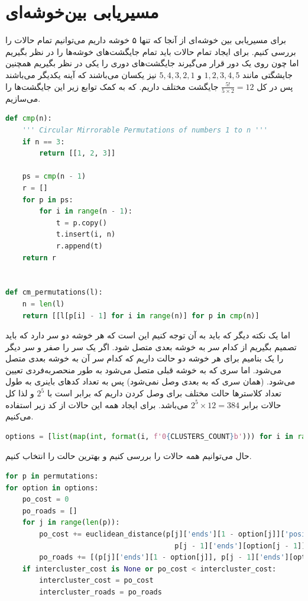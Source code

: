 \documentclass[a4paper, 12pt]{article}
\theoremstyle{definition}
\begin{document}
\section{مسیریابی بین‌خوشه‌ای}

برای مسیریابی بین خوشه‌ای از آنجا که تنها ۵ خوشه داریم می‌توانیم تمام حالات را بررسی کنیم. برای ایجاد تمام حالات باید تمام جایگشت‌های خوشه‌ها را در نظر بگیریم اما چون روی یک دور قرار می‌گیرند جایگشت‌های دوری را یکی در نظر بگیریم همچنین جایشگتی مانند
$1, 2, 3, 4, 5$
و
$5, 4, 3, 2, 1$
نیز یکسان می‌باشند که آینه یکدیگر می‌باشند پس در کل
$\frac{5!}{5 \times 2} = 12$
جایگشت مختلف داریم. که به کمک توابع زیر این جایگشت‌ها را می‌سازیم.

\LTR
\begin{lstlisting}[language=Python]
def cmp(n):
    ''' Circular Mirrorable Permutations of numbers 1 to n '''
    if n == 3:
        return [[1, 2, 3]]

    ps = cmp(n - 1)
    r = []
    for p in ps:
        for i in range(n - 1):
            t = p.copy()
            t.insert(i, n)
            r.append(t)
    return r


def cm_permutations(l):
    n = len(l)
    return [[l[p[i] - 1] for i in range(n)] for p in cmp(n)]
\end{lstlisting}
\RTL

اما یک نکته دیگر که باید به آن توجه کنیم این است که هر خوشه دو سر دارد که باید تصمیم بگیریم از کدام سر به خوشه بعدی متصل شود. اگر یک سر را صفر و سر دیگر را یک بنامیم برای هر خوشه دو حالت داریم که کدام سر آن به خوشه بعدی متصل می‌شود. اما سری که به خوشه قبلی متصل می‌شود به طور منحصربه‌فردی تعیین می‌شود. (همان سری که به بعدی وصل نمی‌شود) پس به تعداد کدهای باینری به طول تعداد کلاسترها حالت مختلف برای وصل کردن داریم که برابر است با
$2^5$
و لذا کل حالات برابر
$2^5 \times 12 = 384$
می‌باشد. برای ایجاد همه این حالات از کد زیر استفاده می‌کنیم.

\LTR
\begin{lstlisting}[language=Python]
options = [list(map(int, format(i, f'0{CLUSTERS_COUNT}b'))) for i in range(2 ** CLUSTERS_COUNT)]
\end{lstlisting}
\RTL

حال می‌توانیم همه حالات را بررسی کنیم و بهترین حالت را انتخاب کنیم.

\LTR
\begin{lstlisting}[language=Python]
for p in permutations:
for option in options:
    po_cost = 0
    po_roads = []
    for j in range(len(p)):
        po_cost += euclidean_distance(p[j]['ends'][1 - option[j]]['position'],
                                        p[j - 1]['ends'][option[j - 1]]['position'])
        po_roads += [(p[j]['ends'][1 - option[j]], p[j - 1]['ends'][option[j - 1]])]
    if intercluster_cost is None or po_cost < intercluster_cost:
        intercluster_cost = po_cost
        intercluster_roads = po_roads
\end{lstlisting}
\RTL
\end{document}
